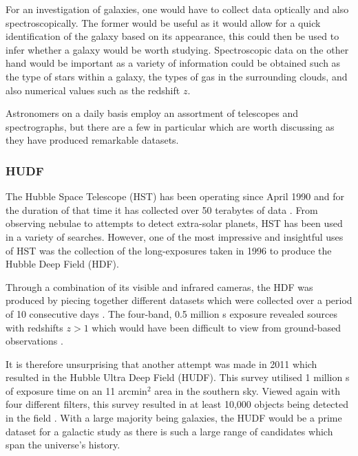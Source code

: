 \documentclass[12pt, twocolumn]{revtex4-1}    %
\begin{document}
For an investigation of galaxies, one would have to collect data optically and also spectroscopically. The former would be useful as it would allow for a quick identification of the galaxy based on its appearance, this could then be used to infer whether a galaxy would be worth studying. Spectroscopic data on the other hand would be important as a variety of information could be obtained such as the type of stars within a galaxy, the types of gas in the surrounding clouds, and also numerical values such as the redshift $z$. 

Astronomers on a daily basis employ an assortment of telescopes and spectrographs, but there are a few in particular which are worth discussing as they have produced remarkable datasets.

\subsubsection*{HUDF}

The Hubble Space Telescope (HST) has been operating since April 1990 and for the duration of that time it has collected over 50 terabytes of data \citep{mccoy_space_sciences}. From observing nebulae to attempts to detect extra-solar planets, HST has been used in a variety of searches. However, one of the most impressive and insightful uses of HST was the collection of the long-exposures taken in 1996 to produce the Hubble Deep Field (HDF). 

Through a combination of its visible and infrared cameras, the HDF was produced by piecing together different datasets which were collected over a period of 10 consecutive days \citep{mccoy_space_sciences, williams_hdp}. The four-band, 0.5 million s exposure revealed sources with redshifts $z>1$ which would have been difficult to view from ground-based observations \citep{beckwith_hudf}. 


It is therefore unsurprising that another attempt was made in 2011 which resulted in the Hubble Ultra Deep Field (HUDF). This survey utilised 1 million s of exposure time on an 11 arcmin$^2$ area in the southern sky. Viewed again with four different filters, this survey resulted in at least 10,000 objects being detected in the field \citep{beckwith_hudf}. With a large majority being galaxies, the HUDF would be a prime dataset for a galactic study as there is such a large range of candidates which span the universe's history. 
\end{document}
